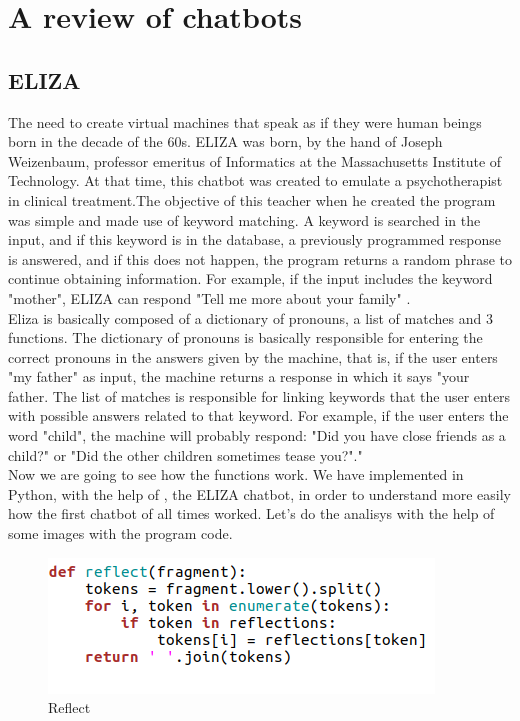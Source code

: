 \documentclass[12pt,twoside]{article}
\theoremstyle{plain}
\theoremstyle{definition}
\theoremstyle{remark}
\begin{document}
\section{A review of chatbots}
\label{sec:basics}

\subsection{ELIZA}
	\label{sec:eliza}
The need to create virtual machines that speak as if they were human beings born in the decade of the 60s. ELIZA was born, by the hand of Joseph Weizenbaum, professor emeritus of Informatics at the Massachusetts Institute of Technology. At that time, this chatbot was created to emulate a psychotherapist in clinical treatment.The objective of this teacher when he created the program was simple and made use of keyword matching. A keyword is searched in the input, and if this keyword is in the database, a previously programmed response is answered, and if this does not happen, the program returns a random phrase to continue obtaining information. For example, if the input includes the keyword "mother", ELIZA can respond "Tell me more about your family" \cite{shawar2007chatbots}.\\

Eliza is basically composed of a dictionary of pronouns, a list of matches and 3 functions.\cite{joseph1966eliza} The dictionary of pronouns is basically responsible for entering the correct pronouns in the answers given by the machine, that is, if the user enters "my father" as input, the machine returns a response in which it says "your father. The list of matches is responsible for linking keywords that the user enters with possible answers related to that keyword. For example, if the user enters the word "child", the machine will probably respond: "Did you have close friends as a child?" or "Did the other children sometimes tease you?"."\cite{joseph1966eliza}\\

Now we are going to see how the functions work. We have implemented in Python, with the help of \cite{small2017}, the ELIZA chatbot, in order to understand more easily how the first chatbot of all times worked. Let's do the analisys with the help of some images with the program code.\\

\begin{figure}[h]
\centering
\includegraphics[scale=0.6]{./Pictures/reflect.png}
\caption{Reflect} 
\end{figure}
\end{document}
